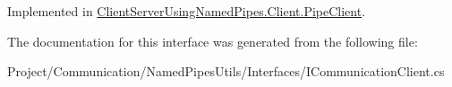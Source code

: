Implemented in \hyperlink{class_client_server_using_named_pipes_1_1_client_1_1_pipe_client_af1b876c52ee2cfc920dcf56ea7434839}{Client\+Server\+Using\+Named\+Pipes.\+Client.\+Pipe\+Client}.



The documentation for this interface was generated from the following file\+:\begin{DoxyCompactItemize}
\item 
Project/\+Communication/\+Named\+Pipes\+Utils/\+Interfaces/I\+Communication\+Client.\+cs\end{DoxyCompactItemize}
